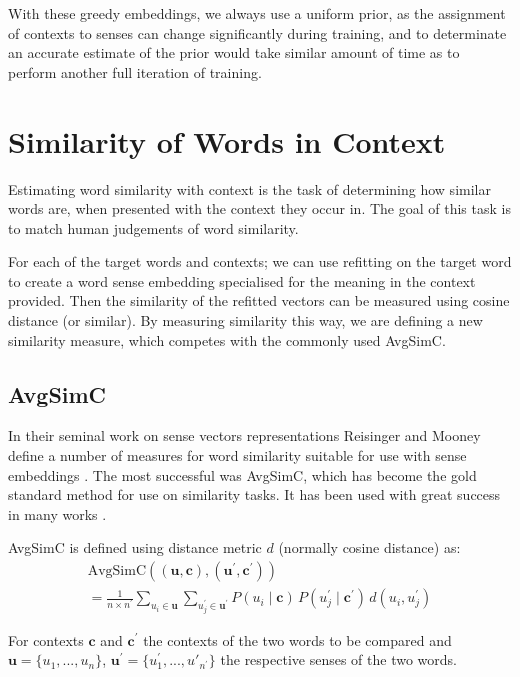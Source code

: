 \documentclass{sig-alternate}
\renewcommand{\c}{\mathbf{c}}
\renewcommand{\u}{\mathbf{u}}
\begin{document}
With these greedy embeddings, we always use a uniform prior, as the assignment of contexts  to senses can change significantly during training, and to determinate an accurate estimate of the prior would take similar amount of time as to perform another full iteration of training.



\section{Similarity of Words in Context} \label{SimilarityInContext}
Estimating word similarity with context is the task of determining how similar words are, when presented with the context they occur in. The goal of this task is to match human judgements of word similarity.

For each of the target words and contexts; we can use refitting on the target word to create a word sense embedding specialised for the meaning in the context provided. Then the similarity of the refitted vectors can be measured using cosine distance (or similar).
By measuring similarity this way, we are defining a new similarity measure, which competes with the commonly used AvgSimC.

\subsection{AvgSimC}
In their seminal work on sense vectors representations Reisinger and Mooney define a number of measures for word similarity suitable for use with sense embeddings \parencite{Reisinger2010}. The most successful was AvgSimC, which has become the gold standard method for use on similarity tasks. It has been used with great success in many works \cite{Huang2012, Chen2014, tian2014probabilistic}. 


AvgSimC is defined using distance metric $d$ (normally cosine distance) as: 
\begin{multline} \label{eq:avgsimc}
\mathrm{AvgSimC}((\u,\c),(\u^{\prime},\c^{\prime})) \\
=  \frac{1}{n \times n^{\prime}}
\sum_{u_{i}\in\u}
\sum_{u_{j}^{\prime}\in\u^{\prime}}
P(u_{i}\mid\c)\,P(u_{j}^{\prime}\mid\c^{\prime})\,d(u_{i},u_{j}^{\prime})
\end{multline}

For contexts $\c$ and $\c^\prime$ the contexts of the two words to be compared and  $\u=\{u_1,...,u_n\}$, $\u^\prime=\{u^\prime_1,...,u\prime_{n^\prime}\}$ the respective senses of the two words.
\end{document}
